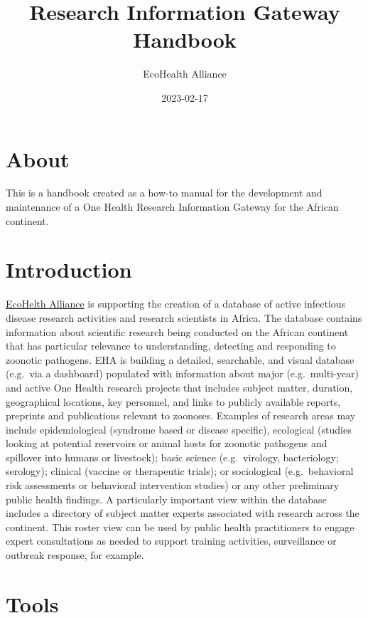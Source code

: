 \documentclass[
]{book}
\title{Research Information Gateway Handbook}
\author{EcoHealth Alliance}
\date{2023-02-17}
\begin{document}
\maketitle

{
\setcounter{tocdepth}{1}
\tableofcontents
}
\hypertarget{about}{%
\chapter{About}\label{about}}

This is a handbook created as a how-to manual for the development and maintenance of a One Health Research Information Gateway for the African continent.

\hypertarget{introduction}{%
\chapter{Introduction}\label{introduction}}

\href{https://www.ecohealthalliance.org/}{EcoHelth Alliance} is supporting the creation of a database of active infectious disease research activities and research scientists in Africa. The database contains information about scientific research being conducted on the African continent that has particular relevance to understanding, detecting and responding to zoonotic pathogens. EHA is building a detailed, searchable, and visual database (e.g.~via a dashboard) populated with information about major (e.g.~multi-year) and active One Health research projects that includes subject matter, duration, geographical locations, key personnel, and links to publicly available reports, preprints and publications relevant to zoonoses. Examples of research areas may include epidemiological (syndrome based or disease specific), ecological (studies looking at potential reservoirs or animal hosts for zoonotic pathogens and spillover into humans or livestock); basic science (e.g.~virology, bacteriology; serology); clinical (vaccine or therapeutic trials); or sociological (e.g.~behavioral risk assessments or behavioral intervention studies) or any other preliminary public health findings. A particularly important view within the database includes a directory of subject matter experts associated with research across the continent. This roster view can be used by public health practitioners to engage expert consultations as needed to support training activities, surveillance or outbreak response, for example.

\hypertarget{tools}{%
\chapter{Tools}\label{tools}}
\end{document}

